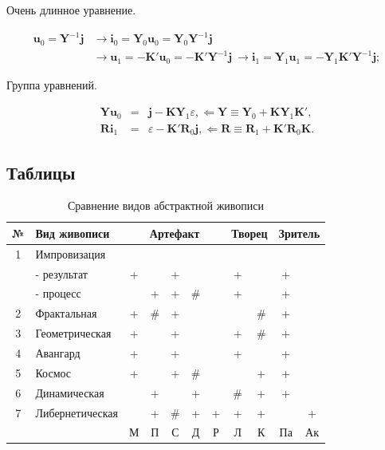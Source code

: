 \documentclass[utf8]{../IncArticle}
\begin{document}
Очень длинное уравнение.


\begin{equation}%
\begin{split}
\bm{u}_0 = \bm{Y}^{-1}\bm{j}&\rightarrow\bm{i}_0 = \bm{Y}_0\bm{u}_0 = \bm{Y}_0\bm{Y}^{-1}\bm{j}\\
      &\rightarrow\bm{u}_1 = -\bm{K}{'}\bm{u}_0 = -\bm{K}{'}\bm{Y}^{-1}\bm{j}\
      \rightarrow\bm{i}_1 = \bm{Y}_1\bm{u}_1 = -\bm{Y}_1\bm{K}{'}\bm{Y}^{-1}\bm{j};
\end{split}
\end{equation}

Группа уравнений.

\begin{subequations}
\begin{eqnarray}%
\bm{Yu}_0 &=& \bm{j} - \bm{KY}_1\varepsilon,\Leftarrow\bm{Y}\equiv\bm{Y}_0 + \bm{KY}_1\bm{K}{'},			\\
\bm{Ri}_1 &=& \varepsilon - \bm{K}{'}\bm{R}_0\bm{j},\Leftarrow\bm{R}\equiv\bm{R}_1 + \bm{K}{'}\bm{R}_0\bm{K}.
\end{eqnarray}
\end{subequations}

\subsection{Таблицы}
\begin{table}[h]
	\centering\small
\caption{Сравнение видов абстрактной живописи\label{tab1}}
\begin{tabular}{|c|p{35mm}|c|c|c|c|c|c|c|c|c|}\hline\hline
№	&{\bf Вид живописи} &\multicolumn{5}{|c|}{\bf Артефакт}&\multicolumn{2}{c|}{\bf Творец}&\multicolumn{2}{c|}{\bf Зритель}\\\hline
1	&  Импровизация &&&&&&&&& \\%
  & - результат & +	&   & + &    &  & + &   & +	& \\
  & - процесс	  &   & + & + & \# &  & + &   & + & \\
\hline
2	& Фрактальная	& +	& \#&	+	&		 &  &   &	\#&	+ &	\\
\hline
3	& Геометрическая&	+	&   &	+	&	   &	& +	& \#&	+	& \\
\hline
4	& Авангард	    & +	&	  & +	&    &  &	+	&   & +	& \\
\hline
5	& Космос	      & +	&   &	+	& \# &	&   &	+	& +	&\\
\hline
6	& Динамическая	&	  & +	&	  & +	 &  &	\#&	+	& +	&\\
\hline
7	& Либернетическая&	&	+	&\#	& +	 &+	& +	&+&		&+ \\
\hline
	&                &М	&П	&С	&Д	&Р	&Л	&К	&Па	&Ак\\
\hline\hline
\end{tabular}
\end{table}
\end{document}
